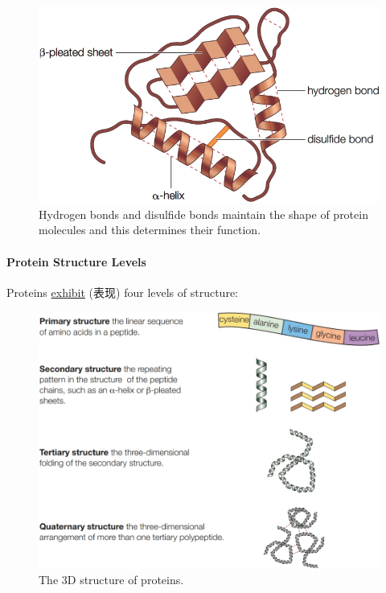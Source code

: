 \begin{itemize}
\begin{figure}[H]
        \includegraphics[scale=0.3]{Biology/1A/Images/1A-5-3.png}
        \caption{Hydrogen bonds and disulfide bonds maintain the shape of protein molecules and this determines their function.}
    \end{figure}
\end{itemize}

\paragraph{Protein Structure Levels} Proteins \underline{exhibit} (表现) four levels of structure:
\begin{figure}[H]
    \centering
    \includegraphics[scale=0.4]{Biology/1A/Images/1A-5-4.png}
    \caption{The 3D structure of proteins.}
\end{figure}

